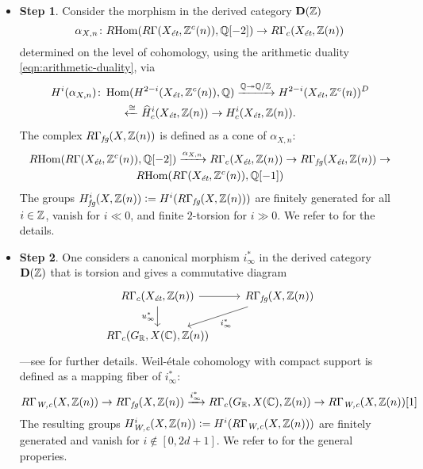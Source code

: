 \documentclass{article}
\numberwithin{equation}{section}
\begin{document}
\begin{itemize}
\item \textbf{Step 1}. Consider the morphism in the derived category
  $\mathbf{D} (\ZZ)$
  \[ \alpha_{X,n}\colon \RHom (R\Gamma (X_\et, \ZZ^c(n)), \QQ [-2]) \to
    R\Gamma_c (X_\et, \ZZ(n)) \]
  determined on the level of cohomology, using the arithmetic duality
  \eqref{eqn:arithmetic-duality}, via
  \begin{multline*}
    H^i (\alpha_{X,n})\colon \Hom (H^{2-i} (X_\et, \ZZ^c(n)), \QQ)
    \xrightarrow{\QQ \twoheadrightarrow \QQ/\ZZ}
    H^{2-i} (X_\et, \ZZ^c(n))^D \\
    \xleftarrow{\cong} \widehat{H}^i_c (X_\et, \ZZ(n)) \to
    H^i_c (X_\et, \ZZ(n)).
  \end{multline*}
  The complex $R\Gamma_\fg (X, \ZZ(n))$ is defined as a cone of
  $\alpha_{X,n}$:
  \begin{multline*}
    \RHom (R\Gamma (X_\et, \ZZ^c(n)), \QQ [-2]) \xrightarrow{\alpha_{X,n}}
    R\Gamma_c (X_\et, \ZZ(n)) \to
    R\Gamma_\fg (X_\et, \ZZ(n)) \to \\
    \RHom (R\Gamma (X_\et, \ZZ^c(n)), \QQ [-1])
  \end{multline*}
  The groups $H^i_\fg (X, \ZZ(n)) \dfn H^i (R\Gamma_\fg (X, \ZZ(n)))$ are
  finitely generated for all $i \in \ZZ$, vanish for $i \ll 0$, and finite
  $2$-torsion for $i \gg 0$.  We refer to \cite[\S 5]{Beshenov-Weil-etale-1} for
  the details.

\item \textbf{Step 2}. One considers a canonical morphism $i^*_\infty$ in the
  derived category $\mathbf{D} (\ZZ)$ that is torsion and gives a commutative
  diagram
  \[ \begin{tikzcd}
      R\Gamma_c (X_\et, \ZZ(n)) \ar{r}\ar{d}[swap]{u^*_\infty} & R\Gamma_\fg (X, \ZZ(n)) \ar{dl}{i^*_\infty} \\
      R\Gamma_c (G_\RR, X(\CC), \ZZ(n))
    \end{tikzcd} \]
  ---see \cite[\S\S 6,7]{Beshenov-Weil-etale-1} for further details.
  Weil-étale cohomology with compact support is defined as a mapping fiber of
  $i^*_\infty$:
  \[ R\Gamma_\Wc (X, \ZZ(n)) \to
    R\Gamma_\fg (X, \ZZ(n)) \xrightarrow{i^*_\infty}
    R\Gamma_c (G_\RR, X(\CC), \ZZ(n)) \to
    R\Gamma_\Wc (X, \ZZ(n)) [1] \]
  The resulting groups $H^i_\Wc (X, \ZZ(n)) \dfn H^i (R\Gamma_\Wc (X, \ZZ(n)))$
  are finitely generated and vanish for $i \notin [0,2d+1]$. We refer to
  \cite[\S 7]{Beshenov-Weil-etale-1} for the general properies.
\end{itemize}
\end{document}
